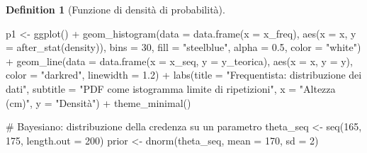 \documentclass[
  letterpaper,
  DIV=11,
  numbers=noendperiod,
  oneside]{scrreprt}
\newenvironment{Shaded}{\begin{snugshade}}{\end{snugshade}}
\newcommand{\AttributeTok}[1]{\textcolor[rgb]{0.40,0.45,0.13}{#1}}
\newcommand{\CommentTok}[1]{\textcolor[rgb]{0.37,0.37,0.37}{#1}}
\newcommand{\DecValTok}[1]{\textcolor[rgb]{0.68,0.00,0.00}{#1}}
\newcommand{\FloatTok}[1]{\textcolor[rgb]{0.68,0.00,0.00}{#1}}
\newcommand{\FunctionTok}[1]{\textcolor[rgb]{0.28,0.35,0.67}{#1}}
\newcommand{\NormalTok}[1]{\textcolor[rgb]{0.00,0.23,0.31}{#1}}
\newcommand{\OtherTok}[1]{\textcolor[rgb]{0.00,0.23,0.31}{#1}}
\newcommand{\SpecialCharTok}[1]{\textcolor[rgb]{0.37,0.37,0.37}{#1}}
\newcommand{\StringTok}[1]{\textcolor[rgb]{0.13,0.47,0.30}{#1}}
\theoremstyle{definition}
\theoremstyle{plain}
\theoremstyle{definition}
\newtheorem{definition}{Definition}[chapter]
\theoremstyle{remark}
\begin{document}
\begin{definition}[Funzione di densità di
probabilità]
\begin{Shaded}
\begin{Highlighting}[]
\NormalTok{p1 }\OtherTok{\textless{}{-}} \FunctionTok{ggplot}\NormalTok{() }\SpecialCharTok{+}
  \FunctionTok{geom\_histogram}\NormalTok{(}\AttributeTok{data =} \FunctionTok{data.frame}\NormalTok{(}\AttributeTok{x =}\NormalTok{ x\_freq), }\FunctionTok{aes}\NormalTok{(}\AttributeTok{x =}\NormalTok{ x, }\AttributeTok{y =} \FunctionTok{after\_stat}\NormalTok{(density)),}
                 \AttributeTok{bins =} \DecValTok{30}\NormalTok{, }\AttributeTok{fill =} \StringTok{"steelblue"}\NormalTok{, }\AttributeTok{alpha =} \FloatTok{0.5}\NormalTok{, }\AttributeTok{color =} \StringTok{"white"}\NormalTok{) }\SpecialCharTok{+}
  \FunctionTok{geom\_line}\NormalTok{(}\AttributeTok{data =} \FunctionTok{data.frame}\NormalTok{(}\AttributeTok{x =}\NormalTok{ x\_seq, }\AttributeTok{y =}\NormalTok{ y\_teorica), }
            \FunctionTok{aes}\NormalTok{(}\AttributeTok{x =}\NormalTok{ x, }\AttributeTok{y =}\NormalTok{ y), }\AttributeTok{color =} \StringTok{"darkred"}\NormalTok{, }\AttributeTok{linewidth =} \FloatTok{1.2}\NormalTok{) }\SpecialCharTok{+}
  \FunctionTok{labs}\NormalTok{(}\AttributeTok{title =} \StringTok{"Frequentista: distribuzione dei dati"}\NormalTok{,}
       \AttributeTok{subtitle =} \StringTok{"PDF come istogramma limite di ripetizioni"}\NormalTok{,}
       \AttributeTok{x =} \StringTok{"Altezza (cm)"}\NormalTok{, }\AttributeTok{y =} \StringTok{"Densità"}\NormalTok{) }\SpecialCharTok{+}
  \FunctionTok{theme\_minimal}\NormalTok{()}

\CommentTok{\# Bayesiano: distribuzione della credenza su un parametro}
\NormalTok{theta\_seq }\OtherTok{\textless{}{-}} \FunctionTok{seq}\NormalTok{(}\DecValTok{165}\NormalTok{, }\DecValTok{175}\NormalTok{, }\AttributeTok{length.out =} \DecValTok{200}\NormalTok{)}
\NormalTok{prior }\OtherTok{\textless{}{-}} \FunctionTok{dnorm}\NormalTok{(theta\_seq, }\AttributeTok{mean =} \DecValTok{170}\NormalTok{, }\AttributeTok{sd =} \DecValTok{2}\NormalTok{)}


\end{Highlighting}
\end{Shaded}
\end{definition}
\end{document}
